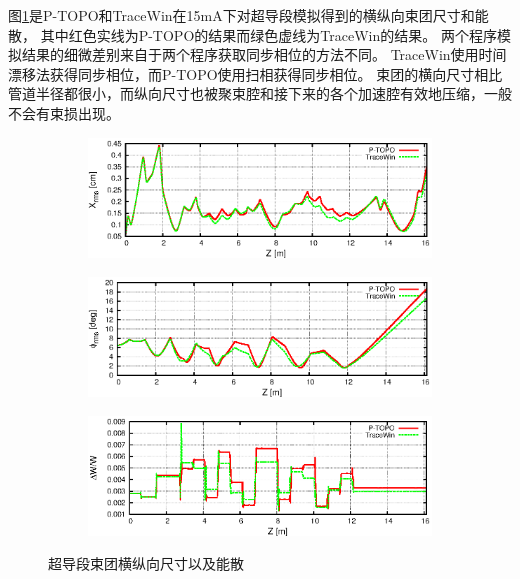 图\ref{fig:ADS_SC_size}是P-TOPO和TraceWin在15mA下对超导段模拟得到的横纵向束团尺寸和能散，
其中红色实线为P-TOPO的结果而绿色虚线为TraceWin的结果。
两个程序模拟结果的细微差别来自于两个程序获取同步相位的方法不同。
TraceWin使用时间漂移法获得同步相位，而P-TOPO使用扫相获得同步相位。
束团的横向尺寸相比管道半径都很小，而纵向尺寸也被聚束腔和接下来的各个加速腔有效地压缩，一般不会有束损出现。
\begin{figure}[!htb]
    \centering
    \begin{subfigure}[b]{0.9\textwidth}
        \includegraphics[width=\textwidth]{Img/ADS_SC_size1.eps}
    \end{subfigure}
    \begin{subfigure}[b]{0.9\textwidth}
        \includegraphics[width=\textwidth]{Img/ADS_SC_size2.eps}
    \end{subfigure}
    \begin{subfigure}[b]{0.9\textwidth}
        \includegraphics[width=\textwidth]{Img/ADS_SC_size3.eps}
    \end{subfigure}
    \caption{超导段束团横纵向尺寸以及能散}\label{fig:ADS_SC_size}
\end{figure}


